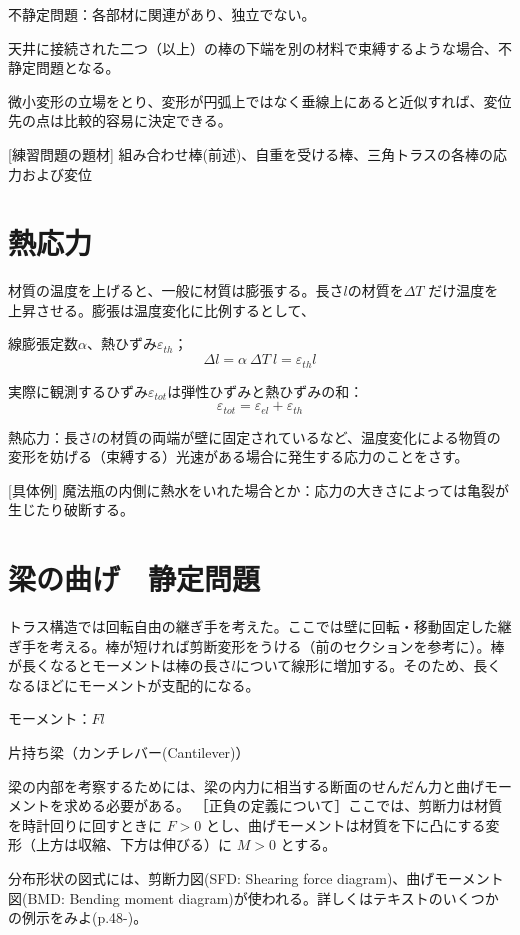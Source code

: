 \documentclass[a4j,10pt,oneside,openany]{jsbook}
\begin{document}
不静定問題：各部材に関連があり、独立でない。
\newline

天井に接続された二つ（以上）の棒の下端を別の材料で束縛するような場合、不静定問題となる。

微小変形の立場をとり、変形が円弧上ではなく垂線上にあると近似すれば、変位先の点は比較的容易に決定できる。
\newline

[練習問題の題材]
組み合わせ棒(前述)、自重を受ける棒、三角トラスの各棒の応力および変位


\section{熱応力}
材質の温度を上げると、一般に材質は膨張する。長さ$l$の材質を$\Delta T$ だけ温度を上昇させる。膨張は温度変化に比例するとして、

線膨張定数$\alpha$、熱ひずみ$\varepsilon_{th}$；
\[\Delta l = \alpha\ \Delta T\ l = \varepsilon_{th} l\]

実際に観測するひずみ$\varepsilon_{tot}$は弾性ひずみと熱ひずみの和：
\[\varepsilon_{tot} = \varepsilon_{el} + \varepsilon_{th}\]

熱応力：長さ$l$の材質の両端が壁に固定されているなど、温度変化による物質の変形を妨げる（束縛する）光速がある場合に発生する応力のことをさす。

[具体例]
魔法瓶の内側に熱水をいれた場合とか：応力の大きさによっては亀裂が生じたり破断する。

\section{梁の曲げ　静定問題}

トラス構造では回転自由の継ぎ手を考えた。ここでは壁に回転・移動固定した継ぎ手を考える。棒が短ければ剪断変形をうける（前のセクションを参考に）。棒が長くなるとモーメントは棒の長さ$l$について線形に増加する。そのため、長くなるほどにモーメントが支配的になる。

モーメント：$Fl$

片持ち梁（カンチレバー(Cantilever)）

梁の内部を考察するためには、梁の内力に相当する断面のせんだん力と曲げモーメントを求める必要がある。
［正負の定義について］ここでは、剪断力は材質を時計回りに回すときに $F>0$ とし、曲げモーメントは材質を下に凸にする変形（上方は収縮、下方は伸びる）に $M>0$ とする。

分布形状の図式には、剪断力図(SFD: Shearing force diagram)、曲げモーメント図(BMD: Bending moment diagram)が使われる。詳しくはテキストのいくつかの例示をみよ(p.48-)。
\end{document}
